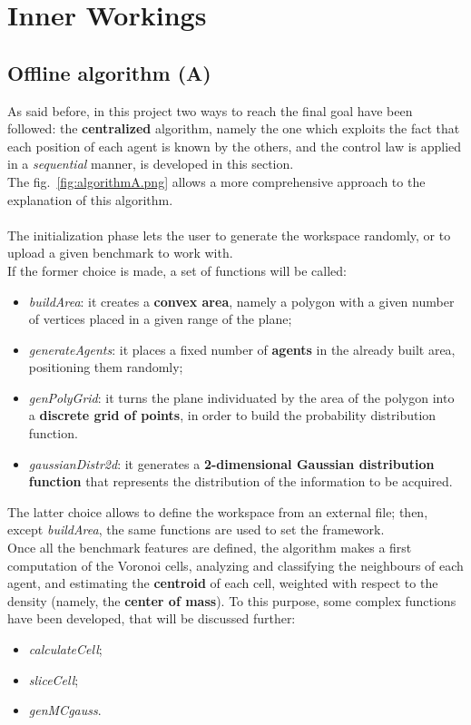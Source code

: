 \documentclass[a4paper,11pt,oneside]{book}
\begin{document}
\newpage %
	
	
	
	\section{Inner Workings}
	\subsection{Offline algorithm (A)}
	
	As said before, in this project two ways to reach the final goal have been followed: the \textbf{centralized} algorithm, namely the one which exploits the fact that each position of each agent is known by the others, and the control law is applied in a \textit{sequential} manner, is developed in this section.\\
The fig.~\ref{fig:algorithmA.png} allows a more comprehensive approach to the explanation of this algorithm.\\\\
The initialization phase lets the user to generate the workspace randomly, or to upload a given benchmark to work with. \\
If the former choice is made, a set of functions will be called:
 \begin{itemize}
		\item \textit{buildArea}: it creates a \textbf{convex area}, namely a polygon with a given number of vertices placed in a given range of the plane;
		\item \textit{generateAgents}: it places a fixed number of \textbf{agents} in the already built area, positioning them randomly;
		\item \textit{genPolyGrid}: it turns the plane individuated by the area of the polygon into a \textbf{discrete grid of points}, in order to build the probability distribution function.  
		\item \textit{gaussianDistr2d}: it generates a \textbf{2-dimensional Gaussian distribution function} that represents the distribution of the information to be acquired. 
\end {itemize}
The latter choice allows to define the workspace from an external file; then, except \textit{buildArea}, the same functions are used to set the framework.\\

Once all the benchmark features are defined, the algorithm makes a first computation of the Voronoi cells, analyzing and classifying the neighbours of each agent, and estimating the \textbf{centroid} of each cell, weighted with respect to the density (namely, the \textbf{center of mass}). To this purpose, some complex functions have been developed, that will be discussed further:
\begin{itemize}
	\item \textit{calculateCell};
	\item \textit{sliceCell};
	\item \textit{genMCgauss}.
\end{itemize}
\end{document}
